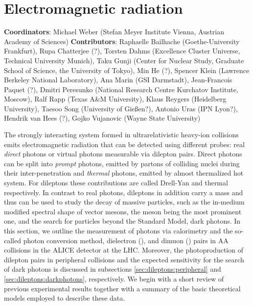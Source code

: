 \documentclass[../report.tex]{subfiles}
\begin{document}
\section{Electromagnetic radiation}

\textbf{Coordinators}: Michael Weber (Stefan Meyer Institute Vienna, Austrian Academy of Sciences) 
\linebreak
\textbf{Contributors}: 
		Raphaelle Bailhache (Goethe-University Frankfurt), 
        Rupa Chatterjee (?),
		Torsten Dahms (Excellence Cluster Universe, Technical University Munich), 
		Taku Gunji (Center for Nuclear Study, Graduate School of Science, the University of Tokyo), 
        Min He (?),
        Spencer Klein (Lawrence Berkeley National Laboratory), 
        Ana Marin (GSI Darmstadt), 
        Jean-Francois Paquet (?),
        Dmitri Peresunko (National Research Centre Kurchatov Institute, Moscow),  
        Ralf Rapp (Texas A\&M University), 
        Klaus Reygers (Heidelberg University), 
        Taesoo Song (University of Gie{\ss}en?), 
        Antonio Uras (IPN Lyon?),
        Hendrik van Hees (?),
        Gojko Vujanovic (Wayne State University)



The strongly interacting system formed in ultrarelativistic heavy-ion collisions 
emits electromagnetic radiation that can be detected using different probes: real {\it direct} photons %
or virtual photons measurable via dilepton pairs. 
Direct photons can be split into {\it prompt} photons, emitted by partons of colliding nuclei during their inter-penetration and {\it thermal} photons, emitted by almost thermalized hot system. 
For dileptons these contributions are called Drell-Yan and thermal respectively.
In contrast to real photons, dileptons in addition carry a mass and thus can be used to study the decay of massive particles, such as the in-medium modified spectral shape of vector mesons, the \PGr meson being the most prominent one, and the search for particles beyond the Standard Model, \eg dark photons. In this section, we outline the measurement of photons via calorimetry and the so-called photon conversion method, dielectron (\Pepem), and dimuon (\PGmpGmm) pairs in AA collisions in the ALICE detector at the LHC. Moreover, the photoproduction of dilepton pairs in peripheral collisions and the expected sensitivity for the search of dark photons is discussed in subsections \ref{sec:dileptons:peripheral} and \ref{sec:dileptons:darkphotons}, respectively. We begin with a short review of previous experimental results together with a summary of the basic theoretical models employed to describe these data.
\end{document}
